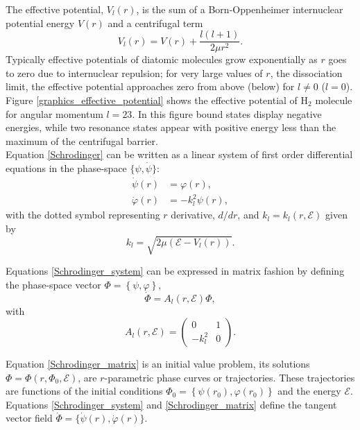 \documentclass[%
 aip,
 numerical,
 jcp,
 floatfix,
rsi,%
amsmath,amssymb,
reprint,%
author-year%
]{revtex4-1}
\begin{document}
The effective potential, $V_l(r)$, is the sum of a Born-Oppenheimer internuclear potential energy $V(r)$ and a centrifugal term  
\begin{equation}\label{effective_potential}
    V_l(r)=V(r)+\frac{l(l+1)}{2\mu r^2}.
\end{equation}
Typically effective potentials of diatomic molecules grow exponentially as $r$ goes to zero due to internuclear repulsion; for very large values of $r$, the dissociation limit, the effective potential approaches zero from above (below) for $l\ne 0$ ($l=0$). Figure \ref{graphics_effective_potential} shows the effective potential of $\mathrm{H}_2$ molecule for angular momentum $l=23$. In this figure bound states display negative energies, while two resonance states appear with positive energy less than the maximum of the centrifugal barrier.
\\
Equation \eqref{Schrodinger} can be written as a linear system of first order differential equations in the phase-space $\{\psi,\dot\psi\}$:
\begin{subequations}\label{Schrodinger_system}
\begin{align}
    \dot{\psi}(r) &= \varphi(r), \\
    \dot{\varphi}(r) &= -k_l^2\psi(r),
\end{align}
\end{subequations}
with the dotted symbol representing $r$ derivative, $d/dr$, and $k_l=k_l(r,\mathcal{E})$ given by
\begin{equation}\label{kL_equation}
    k_l=\sqrt{2\mu\left(\mathcal{E}-V_l(r)\right)}.
\end{equation}


Equations \eqref{Schrodinger_system} can be expressed in matrix fashion by defining the phase-space vector $\Phi=\left\{\psi,\varphi\right\}$,
\begin{equation}\label{Schrodinger_matrix}
\dot{\Phi}=A_{l}(r,\mathcal{E})\Phi,
\end{equation}
with
\begin{equation}\label{Matrix_A}
A_{l}(r,\mathcal{E})=\begin{pmatrix}
    0 & 1 \\
    -k_l^2 & 0
    \end{pmatrix}.
\end{equation}

Equation \eqref{Schrodinger_matrix} is an initial value problem, its solutions $\Phi=\Phi(r,\Phi_0,\mathcal{E})$, are $r$-parametric phase curves or trajectories. These trajectories are functions of the initial conditions $\Phi_0=\left\{\psi(r_0),\varphi(r_0)\right\}$ and the energy $\mathcal{E}$. Equations \eqref{Schrodinger_system} and \eqref{Schrodinger_matrix} define the tangent vector field $\dot\Phi=\{\dot\psi(r),\dot\varphi(r)\}$. 
\end{document}
